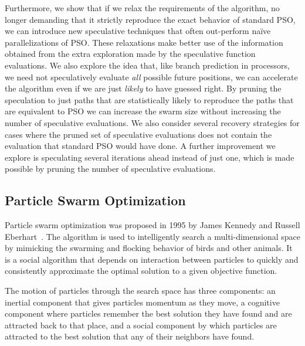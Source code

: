 \documentclass[ms]{byuprop}
\begin{document}
Furthermore, we show that if we relax the requirements of the algorithm, no
longer demanding that it strictly reproduce the exact behavior of standard PSO,
we can introduce new speculative techniques that often out-perform na\"ive
parallelizations of PSO.  These relaxations make better use of the information
obtained from the extra exploration made by the speculative function
evaluations.  We also explore the idea that, like branch prediction in
processors, we need not speculatively evaluate \emph{all} possible future
positions, we can accelerate the algorithm even if we are just \emph{likely} to
have guessed right.  By pruning the speculation to just paths that are
statistically likely to reproduce the paths that are equivalent to PSO we can
increase the swarm size without increasing the number of speculative
evaluations.  We also consider several recovery strategies for cases where the
pruned set of speculative evaluations does not contain the evaluation that
standard PSO would have done.  A further improvement we explore is speculating
several iterations ahead instead of just one, which is made possible by pruning
the number of speculative evaluations.

\subsection{Particle Swarm Optimization}
\label{sec:pso}

Particle swarm optimization was proposed in 1995 by James Kennedy and Russell
Eberhart~\citep{kennedy-1995-particle-swarm-optimization}.  The algorithm is
used to intelligently search a multi-dimensional space by mimicking the
swarming and flocking behavior of birds and other animals. It is a social
algorithm that depends on interaction between particles to quickly and
consistently approximate the optimal solution to a given objective function.

The motion of particles through the search space has three components: an
inertial component that gives particles momentum as they move, a cognitive
component where particles remember the best solution they have found and are
attracted back to that place, and a social component by which particles are
attracted to the best solution that any of their neighbors have found.
\end{document}
